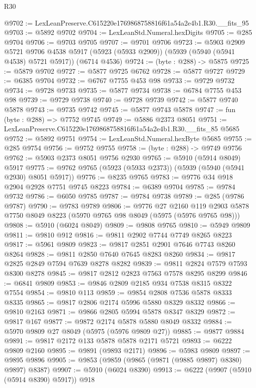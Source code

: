 \begin{lexlean}{R30}
\begin{coremodule}
@9702 := LexLeanPreserve.C615220e1769868758816f61a54a2e4b1.R30.__fits_95
@9703 := @5892 @9702
@9704 := LexLeanStd.Numeral.hexDigits
@9705 := @285 @9704
@9706 := @9703 @9705
@9707 := @9701 @9706
@9723 := @5903
    @2909
    @5721
    @9706
    @4538
    @5917
    (@5923 (@5933 @2909))
    (@5939 (@5940 (@5941 @4538) @5721 @5917))
    (@6714 @4536)
@9724 := (byte : @288) -> @5875
@9725 := @5879 @9702
@9727 := @5877 @9725 @6762
@9728 := @5877 @9727
@9729 := @6385 @9704
@9732 := @6767 @7755 @453 @98
@9733 := @9729 @9732
@9734 := @9728 @9733
@9735 := @5877 @9734
@9738 := @6784 @7755 @453 @98
@9739 := @9729 @9738
@9740 := @9728 @9739
@9742 := @5877 @9740 @5878
@9743 := @9735 @9742
@9745 := @5877 @9743 @5878
@9747 := fun (byte : @288) => @7752 @9745
@9749 := @5886 @2373 @8051
@9751 := LexLeanPreserve.C615220e1769868758816f61a54a2e4b1.R30.__fits_85 @5685
@9752 := @5892 @9751
@9754 := LexLeanStd.Numeral.hexByte @5685
@9755 := @285 @9754
@9756 := @9752 @9755
@9758 := (byte : @288) -> @9749 @9756
@9762 := @5903 @2373 @8051 @9756 @2930
@9765 := @5910 (@5914 @8049) @5917
@9775 := @9762 @9765 (@5923 (@5933 @2373)) (@5939 (@5940 (@5941 @2930) @8051 @5917))
@9776 := @8235 @9765
@9783 := @9776 @34 @918 @2904 @2928 @7751 @9745 @8223
@9784 := @6389 @9704
@9785 := @9784 @9732
@9786 := @6050 @9785
@9787 := @9784 @9738
@9789 := @285 (@9786 @9787)
@9790 := @9783 @9789
@9806 := @9776
    @27
    @2160
    @119
    @2903
    @5878
    @7750
    @8049
    @8223
    (@5970 @9765 @98 @8049 (@5975 (@5976 @9765 @98)))
@9808 := @5910 (@6024 @8049)
@9809 := @9808 @9765
@9810 := @5949 @9809
@9811 := @9810 @912
@9816 := @9811 @2902 @7744 @7749 @8265 @8223
@9817 := @5961 @9809
@9823 := @9817 @2851 @2901 @7646 @7743 @8260 @8264
@9828 := @9811 @2850 @7640 @7645 @8283 @8260
@9834 := @9817 @2825 @2849 @7594 @7639 @8278 @8282
@9839 := @9811 @2824 @7579 @7593 @8300 @8278
@9845 := @9817 @2812 @2823 @7563 @7578 @8295 @8299
@9846 := @6841 @9809
@9853 := @9846 @2809 @2185 @934 @7538 @8315 @8322 @7554
@9854 := @9810 @113
@9859 := @9854 @2808 @7536 @5878 @8333 @8335
@9865 := @9817 @2806 @2174 @5996 @5880 @8329 @8332
@9866 := @9810 @2163
@9871 := @9866 @2805 @5994 @5878 @8347 @8329
@9872 := @9817 @167
@9877 := @9872 @2174 @5878 @5880 @8049 @8332
@9884 := @5970 @9809 @27 @8049 (@5975 (@5976 @9809 @27))
@9885 := @9877 @9884
@9891 := @9817 @2172 @133 @5878 @5878 @2171 @5721
@9893 := @6222 @9809 @2160
@9895 := @9891 (@9893 @2171)
@9896 := @5983 @9809
@9897 := @9895 @9896
@9905 := @9853 (@9859 (@9865 (@9871 (@9885 @9897) @8380) @9897) @8387)
@9907 := @5910 (@6024 @8390)
@9913 := @6222 (@9907 (@5910 (@5914 @8390) @5917)) @918

\end{coremodule}
\end{lexlean}
